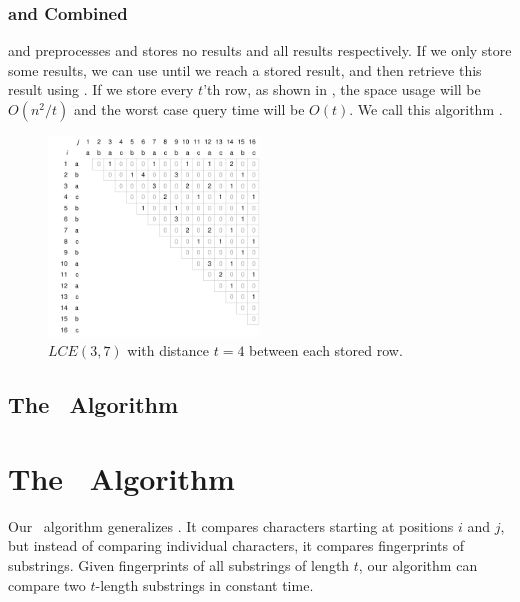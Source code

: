 \documentclass[a4]{article}
\newcommand*{\pref}{\prettyref}
\begin{document}
\subsubsection{ and  Combined}

 and  preprocesses and stores no results and all results respectively. If we only store some results, we can use  until we reach a stored result, and then retrieve this result using . If we store every $t$'th row, as shown in \pref{fig:resultspace-t-row}, the space usage will be $O(n^2/t)$ and the worst case query time will be $O(t)$. We call this algorithm .

\begin{figure}[tp]
    \begin{center}
        \includegraphics[width=0.5\textwidth,page=3]{resultspace.pdf}
    \end{center}
    \caption{\label{fig:resultspace-t-row}$LCE(3,7)$ with distance $t=4$ between each stored row.}
\end{figure}

\subsection{The \fprintk\ Algorithm}

\fi %

\ifarticle
\section{The \fprintk\ Algorithm}
\fi %

Our \fprintk\ algorithm generalizes . It compares characters starting at positions $i$ and $j$, but instead of comparing individual characters, it compares fingerprints of substrings. Given fingerprints of all substrings of length $t$, our algorithm can compare two $t$-length substrings in constant time.
\end{document}
